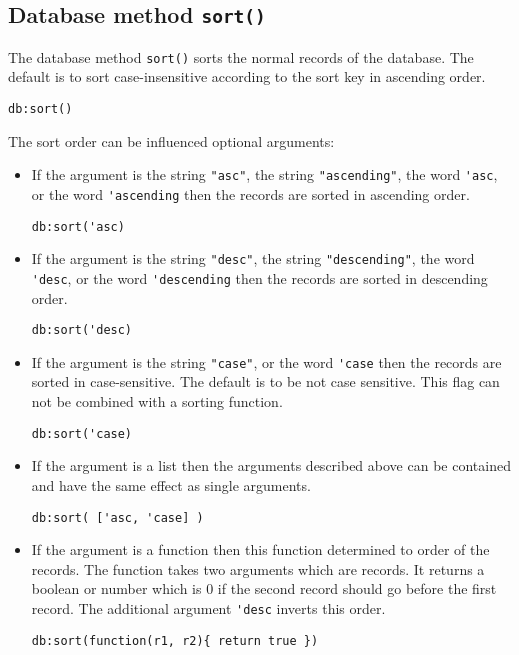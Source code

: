 \documentclass[11pt,a4paper]{scrbook}
\newcommand\method[1]{\texttt{#1}}
\begin{document}
\subsection{Database method \method{sort()}}

The database method \method{sort()} sorts the normal records of the
database. The default is to sort case-insensitive according to the sort key in
ascending order.

\begin{lstlisting}[language=BibTool,mathescape=true]
db:sort()
\end{lstlisting}

The sort order can be influenced optional arguments:

\begin{itemize}
\item If the argument is the string \verb|"asc"|, the string
  \verb|"ascending"|, the word \verb|'asc|, or the word \verb|'ascending| then
  the records are sorted in ascending order.
\begin{lstlisting}[language=BibTool,mathescape=true]
db:sort('asc)
\end{lstlisting}

\item If the argument is the string \verb|"desc"|, the string
  \verb|"descending"|, the word \verb|'desc|, or the word \verb|'descending|
  then the records are sorted in descending order.
\begin{lstlisting}[language=BibTool,mathescape=true]
db:sort('desc)
\end{lstlisting}

\item If the argument is the string \verb|"case"|, or the word \verb|'case|
  then the records are sorted in case-sensitive. The default is to be not case
  sensitive. This flag can not be combined with a sorting function.
\begin{lstlisting}[language=BibTool,mathescape=true]
db:sort('case)
\end{lstlisting}

\item If the argument is a list then the arguments described above can be
  contained and have the same effect as single arguments.
\begin{lstlisting}[language=BibTool,mathescape=true]
db:sort( ['asc, 'case] )
\end{lstlisting}

\item If the argument is a function then this function determined to order of
  the records. The function takes two arguments which are records. It returns
  a boolean or number which is 0 if the second record should go before the
  first record. The additional argument \verb|'desc| inverts this order. 
\begin{lstlisting}[language=BibTool,mathescape=true]
db:sort(function(r1, r2){ return true })
\end{lstlisting}
\end{itemize}
\end{document}
